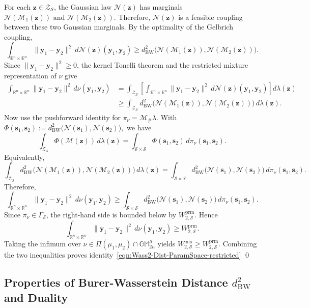 \documentclass[opre,sglanonrev]{informs4}
\newcommand{\mbGM}{\mathbb{GM}}
\newcommand{\bs}{\bm{s}}
\newcommand{\by}{\bm{y}}
\newcommand{\bz}{\bm{z}}
\begin{document}
{\begin{APPENDICES}
For each \(\bz\in\mathcal Z_{\mathcal S}\), the Gaussian law
\(\mathcal N(\bz)\) has marginals $\mathcal N(\mathcal M_1(\bz))
\,\,\text{and}\,\,
\mathcal N(\mathcal M_2(\bz)).$
Therefore, \(\mathcal N(\bz)\) is a feasible coupling between these two
Gaussian marginals. By the optimality of the Gelbrich coupling,
\[
\int_{\mathbb R^n\times\mathbb R^n}
\|\by_1-\by_2\|^2\,d\mathcal N(\bz)(\by_1,\by_2)
\ge
d^2_{\mathrm{BW}}\bigl(
\mathcal N(\mathcal M_1(\bz)),
\mathcal N(\mathcal M_2(\bz))
\bigr).
\]
Since \(\|\by_1-\by_2\|^2\ge0\), the kernel Tonelli theorem and the restricted
mixture representation of \(\nu\) give
\[
\begin{aligned}
\int_{\mathbb R^n\times\mathbb R^n}
\|\by_1-\by_2\|^2\,d\nu(\by_1,\by_2)
&=
\int_{\mathcal Z_{\mathcal S}}
\left[
\int_{\mathbb R^n\times\mathbb R^n}
\|\by_1-\by_2\|^2\,d\mathcal N(\bz)(\by_1,\by_2)
\right]
d\lambda(\bz)\\
&\ge
\int_{\mathcal Z_{\mathcal S}}
d^2_{\mathrm{BW}}\bigl(
\mathcal N(\mathcal M_1(\bz)),
\mathcal N(\mathcal M_2(\bz))
\bigr)
\,d\lambda(\bz).
\end{aligned}
\]
Now use the pushforward identity for $\pi_\nu=\mathcal M_{\#}\lambda.$
With $\Phi(\bs_1,\bs_2)
:=
d^2_{\mathrm{BW}}\bigl(\mathcal N(\bs_1),\mathcal N(\bs_2)\bigr),$
we have
\[
\int_{\mathcal Z_{\mathcal S}}
\Phi(\mathcal M(\bz))\,d\lambda(\bz)
=
\int_{\mathcal S\times\mathcal S}
\Phi(\bs_1,\bs_2)\,d\pi_\nu(\bs_1,\bs_2).
\]
Equivalently,
\[
\int_{\mathcal Z_{\mathcal S}}
d^2_{\mathrm{BW}}\bigl(
\mathcal N(\mathcal M_1(\bz)),
\mathcal N(\mathcal M_2(\bz))
\bigr)
\,d\lambda(\bz)
=
\int_{\mathcal S\times\mathcal S}
d^2_{\mathrm{BW}}\bigl(\mathcal N(\bs_1),\mathcal N(\bs_2)\bigr)
\,d\pi_\nu(\bs_1,\bs_2).
\]
Therefore,
\[
\int_{\mathbb R^n\times\mathbb R^n}
\|\by_1-\by_2\|^2\,d\nu(\by_1,\by_2)
\ge
\int_{\mathcal S\times\mathcal S}
d^2_{\mathrm{BW}}\bigl(\mathcal N(\bs_1),\mathcal N(\bs_2)\bigr)
\,d\pi_\nu(\bs_1,\bs_2).
\]
Since \(\pi_\nu\in\Gamma_{\mathcal S}\), the right-hand side is bounded below by
\(W_{2,\mathcal S}^{\mathrm{prm}}\). Hence
\[
\int_{\mathbb R^n\times\mathbb R^n}
\|\by_1-\by_2\|^2\,d\nu(\by_1,\by_2)
\ge
W_{2,\mathcal S}^{\mathrm{prm}}.
\]
Taking the infimum over
\(\nu\in\Pi(\mu_1,\mu_2)\cap\mbGM_{2n}^{\mathcal S}\) yields $W_{2,\mathcal S}^{\mathrm{mix}}
\ge
W_{2,\mathcal S}^{\mathrm{prm}}.$
Combining the two inequalities proves identity~\eqref{eqn:Wass2-Dist-ParamSpace-restricted} \hfill\qed

\subsection{\texorpdfstring{Properties of Burer-Wasserstein Distance $d^2_{\mathrm{BW}}$ and Duality}{Properties of Burer-Wasserstein Distance and Duality}}\label{appndx:proof-of-lem: Delta-Continuity}



\end{APPENDICES}}
\end{document}
